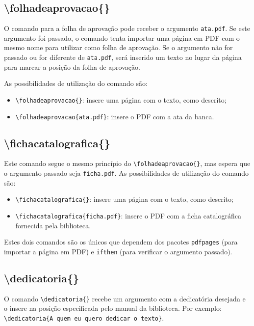     \subsection{\textbackslash folhadeaprovacao\{\}}
    O comando para a folha de aprovação pode receber o argumento \texttt{ata.pdf}. Se este argumento foi passado, o comando tenta importar uma página em PDF com o mesmo nome para utilizar como folha de aprovação. Se o argumento não for passado ou for diferente de \texttt{ata.pdf}, será inserido um texto no lugar da página para marcar a posição da folha de aprovação.

    As possibilidades de utilização do comando são:
    \begin{itemize}
        \item \verb+\folhadeaprovacao{}+: insere uma página com o texto, como descrito;
        \item \verb+\folhadeaprovacao{ata.pdf}+: insere o PDF com a ata da banca.
    \end{itemize}
    
    
    \subsection{\textbackslash fichacatalografica\{\}}
    Este comando segue o mesmo princípio do \verb+\folhadeaprovacao{}+, mas espera que o argumento passado seja \texttt{ficha.pdf}. As possibilidades de utilização do comando são:
    \begin{itemize}
        \item \verb+\fichacatalografica{}+: insere uma página com o texto, como descrito;
        \item \verb+\fichacatalografica{ficha.pdf}+: insere o PDF com a ficha catalográfica fornecida pela biblioteca.
    \end{itemize}
 
 Estes dois comandos são os únicos que dependem dos pacotes \verb+pdfpages+ (para importar a página em PDF) e \verb+ifthen+ (para verificar o argumento passado).

    \subsection{\textbackslash dedicatoria\{\}}
    O comando \verb+\dedicatoria{}+ recebe um argumento com a dedicatória desejada e o insere na posição especificada pelo manual da biblioteca. Por exemplo: \\ \verb+\dedicatoria{A quem eu quero dedicar o texto}+.
    
